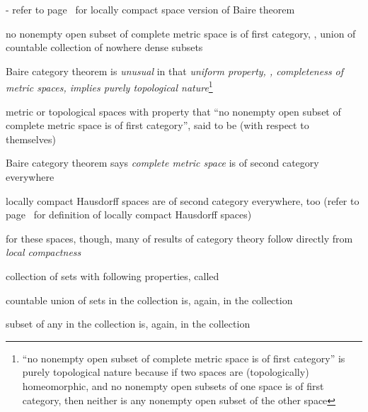 \documentclass[17pt,landscape]{foils}
\begin{document}
{{		\bit
			\item [-] refer to page~\pageref{page:locally-compact-space-version-of-Baire-theorem}
				for locally compact space version of Baire theorem
		\eit

	\vitem {}%
		no nonempty open subset of complete metric space
		is of first category,
		\ie,
		union of countable collection of nowhere dense subsets

	\vitem Baire category theorem is \emph{unusual} in that
		\emph{uniform property, \ie, completeness of metric spaces,
		implies purely topological nature}\footnote{
			``no nonempty open subset of complete metric space is of first category''
			is purely topological nature
			because if two spaces are (topologically) homeomorphic,
			and no nonempty open subsets of one space is of first category,
			then neither is any nonempty open subset of the other space
		}
\eit


%

\bit
	\item metric or topological spaces with property that
			``no nonempty open subset of complete metric space is of first category'',
			said to be 
			(with respect to themselves)%

	\vitem Baire category theorem says \emph{complete metric space} is of second category everywhere%

	\vitem locally compact Hausdorff spaces are of second category everywhere, too
			(refer to page~\pageref{page:Locally-compact-Hausdorff-spaces} for definition of locally compact Hausdorff spaces)%
	\bit
		\item for these spaces, though, many of results of category theory
			follow directly from \emph{local compactness}
	\eit
\eit


%

\bit
	\item collection of sets with following properties, called %
	\bit
		\item countable union of sets in the collection is, again, in the collection
		\item subset of any in the collection is, again, in the collection
	\eit

}}
\end{document}
